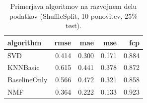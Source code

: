 \begin{table}[h]
\centering
\caption{Primerjava algoritmov na razvojnem delu podatkov (ShuffleSplit, 10 ponovitev, 25\% test).}
\label{tab:algorithm_comparison}
\begin{tabular}{lrrrr}
\toprule
algorithm & rmse & mae & mse & fcp \\
\midrule
SVD & 0.414 & 0.300 & 0.171 & 0.884 \\
KNNBasic & 0.615 & 0.441 & 0.378 & 0.872 \\
BaselineOnly & 0.566 & 0.472 & 0.321 & 0.858 \\
NMF & 0.364 & 0.222 & 0.133 & 0.923 \\
\bottomrule
\end{tabular}

\end{table}
